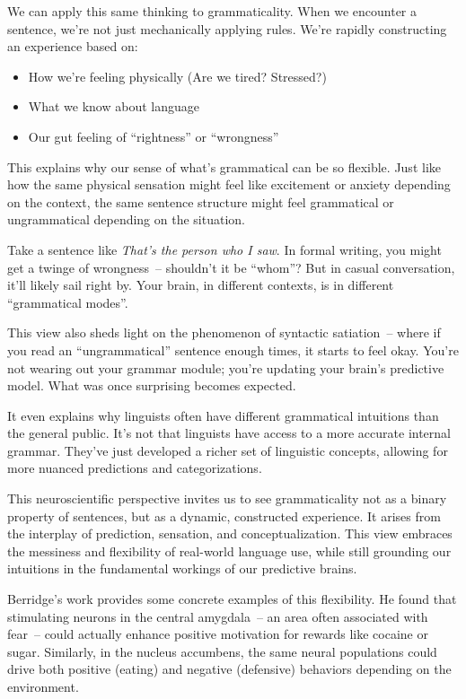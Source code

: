 We can apply this same thinking to grammaticality. When we encounter a sentence, we're not just mechanically applying rules. We're rapidly constructing an experience based on:

\begin{itemize}
    \item How we're feeling physically (Are we tired? Stressed?)
    \item What we know about language
    \item Our gut feeling of ``rightness'' or ``wrongness''
\end{itemize}

This explains why our sense of what's grammatical can be so flexible. Just like how the same physical sensation might feel like excitement or anxiety depending on the context, the same sentence structure might feel grammatical or ungrammatical depending on the situation.

Take a sentence like \textit{That's the person who I saw}. In formal writing, you might get a twinge of wrongness~-- shouldn't it be ``whom''? But in casual conversation, it'll likely sail right by. Your brain, in different contexts, is in different ``grammatical modes''.

This view also sheds light on the phenomenon of syntactic satiation~-- where if you read an ``ungrammatical'' sentence enough times, it starts to feel okay. You're not wearing out your grammar module; you're updating your brain's predictive model. What was once surprising becomes expected.

It even explains why linguists often have different grammatical intuitions than the general public. It's not that linguists have access to a more accurate internal grammar. They've just developed a richer set of linguistic concepts, allowing for more nuanced predictions and categorizations.

This neuroscientific perspective invites us to see grammaticality not as a binary property of sentences, but as a dynamic, constructed experience. It arises from the interplay of prediction, sensation, and conceptualization. This view embraces the messiness and flexibility of real-world language use, while still grounding our intuitions in the fundamental workings of our predictive brains.

Berridge's work provides some concrete examples of this flexibility. He found that stimulating neurons in the central amygdala~-- an area often associated with fear~-- could actually enhance positive motivation for rewards like cocaine or sugar. Similarly, in the nucleus accumbens, the same neural populations could drive both positive (eating) and negative (defensive) behaviors depending on the environment.

